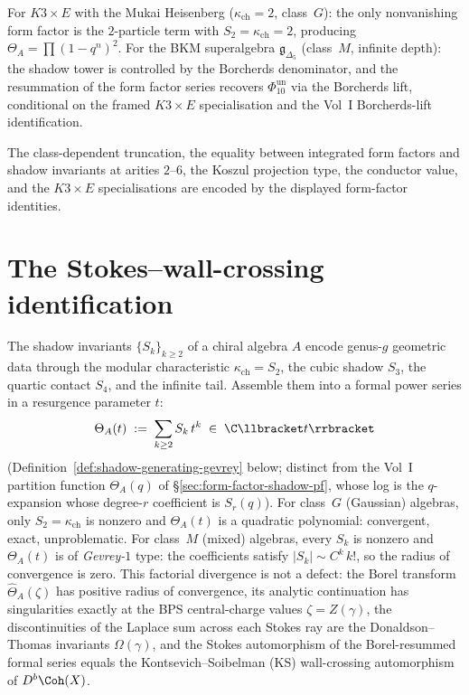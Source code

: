 \begin{remark}
\label{rem:form-factor-k3}
For $K3 \times E$ with the Mukai Heisenberg ($\kappa_{\mathrm{ch}} = 2$,
class~$G$): the only nonvanishing form factor is the $2$-particle
term with $S_2 = \kappa_{\mathrm{ch}} = 2$, producing
$\Theta_A = \prod(1 - q^n)^2$. For the BKM superalgebra
$\mathfrak{g}_{\Delta_5}$ (class~$M$, infinite depth): the shadow tower is
controlled by the Borcherds denominator, and the resummation of the form
factor series recovers $\Phi_{10}^{\mathrm{un}}$ via the Borcherds lift, conditional on
the framed $K3\times E$ specialisation and the Vol~I Borcherds-lift
identification.

\noindent The class-dependent truncation, the equality between integrated form factors and shadow invariants at arities $2$--$6$, the Koszul projection type, the conductor value, and the $K3 \times E$ specialisations are encoded by the displayed form-factor identities.
\end{remark}


\section{The Stokes--wall-crossing identification}
\label{sec:stokes-wallcrossing}
%
%
%

The shadow invariants $\{S_k\}_{k \geq 2}$ of a chiral algebra $A$ encode genus-$g$ geometric data through the modular characteristic $\kappa_{\mathrm{ch}} = S_2$, the cubic shadow $S_3$, the quartic contact $S_4$, and the infinite tail. Assemble them into a formal power series in a resurgence parameter $t$:
\[
 \Theta_A(t) \;:=\; \sum_{k \geq 2} S_k\, t^k \;\in\; \C\llbracket t \rrbracket
\]
(Definition~\ref{def:shadow-generating-gevrey} below; distinct from the Vol~I partition function $\Theta_A(q)$ of \S\ref{sec:form-factor-shadow-pf}, whose log is the $q$-expansion whose degree-$r$ coefficient is $S_r(q)$). For class~$G$ (Gaussian) algebras, only $S_2 = \kappa_{\mathrm{ch}}$ is nonzero and $\Theta_A(t)$ is a quadratic polynomial: convergent, exact, unproblematic. For class~$M$ (mixed) algebras, every $S_k$ is nonzero and $\Theta_A(t)$ is of \emph{Gevrey-$1$} type: the coefficients satisfy $|S_k| \sim C^k\, k!$, so the radius of convergence is zero. This factorial divergence is not a defect: the Borel transform $\hat{\Theta}_A(\zeta)$ has positive radius of convergence, its analytic continuation has singularities exactly at the BPS central-charge values $\zeta = Z(\gamma)$, the discontinuities of the Laplace sum across each Stokes ray are the Donaldson--Thomas invariants $\Omega(\gamma)$, and the Stokes automorphism of the Borel-resummed formal series equals the Kontsevich--Soibelman (KS) wall-crossing automorphism of $D^b\Coh(X)$.

